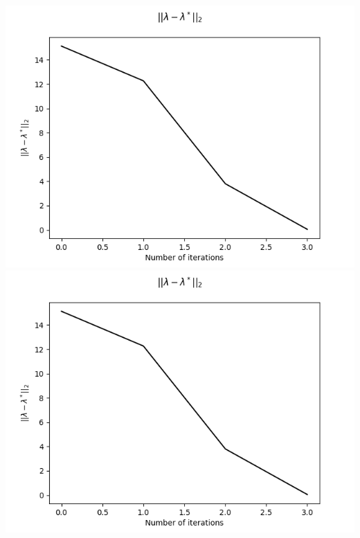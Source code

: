 \documentclass[12pt]{article}
\begin{document}
\includegraphics[scale=0.5]{hw4/plots/plot_6.png}\\
\includegraphics[scale=0.5]{hw4/plots/plot_7.png}\\
\end{document}
